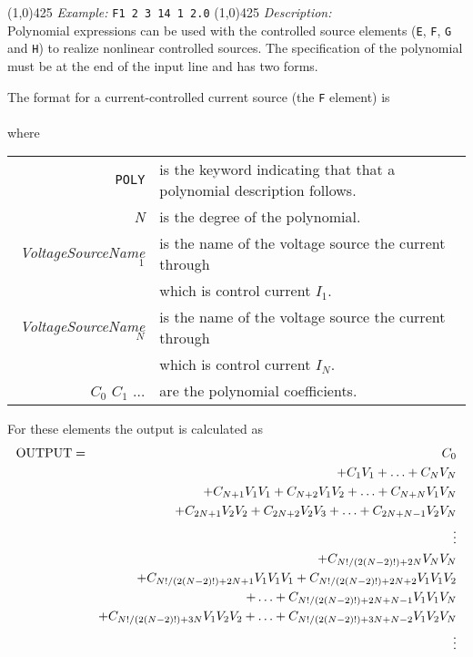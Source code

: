 \newline
\linethickness{0.5mm} \line(1,0){425}
\newline
\textit{Example:}
\newline
\texttt{F1 2 3 14 1 2.0}
\newline
\linethickness{0.5mm} \line(1,0){425}
\newline
\textit{Description:}\\
Polynomial expressions can be used with the controlled source
elements ({\tt E}, {\tt F}, {\tt G} and {\tt H}) to realize
nonlinear controlled sources. The specification of the polynomial
must be at the end of the input line and has two forms.

The format for a current-controlled current source (the {\tt F}
element) is\\[0.1in]
\hspace*{\fill}\\
where
\newline
\begin{tabular}{r l}
{\tt POLY} & is the keyword indicating that that a polynomial
description follows.\\
{\it N} & is the degree of the polynomial.\\
{\it VoltageSourceName$_1$} & is the name of the voltage source
the current through\\
& which is control current $I_1$.\\
{\it VoltageSourceName$_N$} & is the name of the voltage source
the current through\\
& which is control current $I_N$.\\
$C_0$ $C_1$ $\ldots$ & are the polynomial coefficients.
\end{tabular}

For these elements the output is calculated as
\begin{eqnarray}
{\rm OUTPUT} & = & C_0 \nonumber\\
         &   & + C_1V_1 + \ldots + C_NV_N\nonumber\\
         &   & + C_{N+1}V_1V_1 + C_{N+2}V_1V_2 + \ldots + C_{N+N}V_1V_N
             \nonumber\\
         &   & + C_{2N+1}V_2V_2 + C_{2N+2}V_2V_3 +\ldots + C_{2N+N-1}V_2V_N
             \nonumber\\
         &   & \vdots
             \nonumber\\
         &   & + C_{N!/(2(N-2)!)+2N}V_NV_N
             \nonumber\\
         &   & + C_{N!/(2(N-2)!)+2N+1}V_1V_1V_1 +
               C_{N!/(2(N-2)!)+2N+2}V_1V_1V_2\\
         &   & \ \ \ \ \ \ \ + \ldots +
               C_{N!/(2(N-2)!)+2N+N-1}V_1V_1V_N
                   \nonumber\\
         &   & + C_{N!/(2(N-2)!)+3N}V_1V_2V_2 + \ldots +
               C_{N!/(2(N-2)!)+3N+N-2}V_1V_2V_N
                   \nonumber\\
         &   & \vdots
\end{eqnarray}

